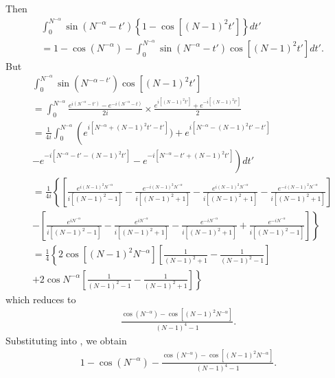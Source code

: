 \documentclass[12pt,reqno]{amsart}
\numberwithin{equation}{section}  %
\renewcommand{\cref}{\Cref}
\begin{document}
%
%
Then 
%
%
\begin{equation}
  \label{pre-int}
\begin{split}
& \int_{0}^{N^{-\alpha}} \sin(N^{-\alpha} - t')
\left\{1 -\cos[(N-1)^{2}t']  \right\} dt' 
\\
& = 1 - \cos(N^{-\alpha}) - \int_{0}^{N^{-\alpha}} \sin(N^{-\alpha} -t')
\cos[(N-1)^{2}t'] dt'.
\end{split}
\end{equation}
%
%
But
%
%
\begin{equation*}
\begin{split}
   & \int_{0}^{N^{-\alpha}} \sin(N^{-\alpha -t'}) \cos[(N-1)^{2}t'] 
   \\
   & = \int_{0}^{N^{-\alpha}} \frac{e^{i(N^{-\alpha} -t')} -
  e^{-i(N^{-\alpha}-t)}}{2i} \times \frac{e^{i[(N-1)^{2}t']} + e^{-i[(N-1)^{2}t']}}{2}
  \\
  & = \frac{1}{4 i} \int_{0}^{N^{-\alpha}} \left( e^{i[N^{-\alpha} + (N-1)^{2}t'
  - t']}) + e^{i[N^{-\alpha} - (N-1)^{2}t' -t']} \right.
  \\
  & \left. - e^{-i[N^{-\alpha} - t' -
  (N-1)^{2}t']} - e^{-i[N^{-\alpha} - t' + (N-1)^{2}t']}  \right ) dt'
  \\
  & = \frac{1}{4i} \left \{\left[ \frac{e^{i(N-1)^{2}N^{-\alpha}}}{i[(N-1)^{2}-1]} -
  \frac{e^{-i(N-1)^{2}N^{-\alpha}}}{i[(N-1)^{2} +1]} - \frac{e^{i(N-1)^{2}N^{-
  \alpha}}}{i[(N-1)^{2} +1]} - \frac{e^{-i(N-1)^{2}N^{-\alpha}}}{i[(N-1)^{2} +1]}\right] \right.
  \\
  & - \left. \left[
  \frac{e^{iN^{-\alpha}}}{i[(N-1)^{2} -1]} - \frac{e^{iN^{-\alpha}}}{i[(N-1)^{2} +1]} -
  \frac{e^{-iN^{-\alpha}}}{i[(N-1)^{2} +1]} +
  \frac{e^{-iN^{-\alpha}}}{i[(N-1)^{2} -1]}  \right]  \right \}
  \\
  & = \frac{1}{4} \left\{2 \cos[(N-1)^{2}N^{-\alpha}]\left[
  \frac{1}{(N-1)^{2} +1} - \frac{1}{(N-1)^{2} -1} \right] \right.
  \\
  & + \left. 2 \cos N^{-\alpha}
  \left[ \frac{1}{(N-1)^{2} -1} - \frac{1}{(N-1)^{2} +1} \right] \right\}
\end{split}
\end{equation*}
%
which reduces to
%
%
\begin{equation*}
\begin{split}
 \frac{\cos(N^{-\alpha}) - \cos[(N-1)^{2}N^{-\alpha}]}{(N-1)^{4} -1}.
\end{split}
\end{equation*}
%
%
Substituting into \cref{pre-int}, we obtain
%
%
%
\begin{equation*}
\begin{split}
  1 - \cos (N^{-\alpha}) -
  \frac{\cos(N^{-\alpha}) - \cos[(N-1)^{2}N^{-\alpha}]}{(N-1)^{4} -1}.
\end{split}
\end{equation*}
\end{document}
